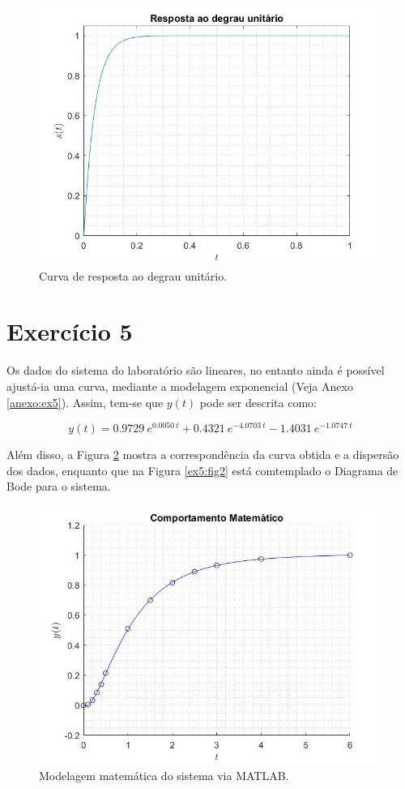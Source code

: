 \documentclass[a4paper,12pt,oneside,openany,table,xcdraw]{article}
\begin{document}
\vspace{0.2cm}
\begin{figure}[H]
\centering
\includegraphics[width=14cm]{ex4-st}
\caption{Curva de resposta ao degrau unitário.}
\label{ex4:st}
\end{figure}

\section{Exercício 5}
Os dados do sistema do laboratório são lineares, no entanto ainda é possível ajustá-ia uma curva, mediante a modelagem exponencial (Veja Anexo \ref{anexo:ex5}). Assim, tem-se que $y(t)$ pode ser descrita como:

$$y(t) = 0.9729\  e^{0.0050\ t} +   0.4321\  e^{-4.0703\ t}      -1.4031\  e^{-1.0747\ t}   $$

Além disso, a Figura \ref{ex5:fig1} mostra a correspondência da curva obtida e a dispersão dos dados, enquanto que na Figura \ref{ex5:fig2} está comtemplado o Diagrama de Bode para o sistema.
\vspace{0.2cm}

\begin{figure}[H]
\centering
\includegraphics[width=14cm]{ex5-comp-mat}
\caption{Modelagem matemática do sistema via MATLAB.}
\label{ex5:fig1}
\end{figure}
\end{document}
